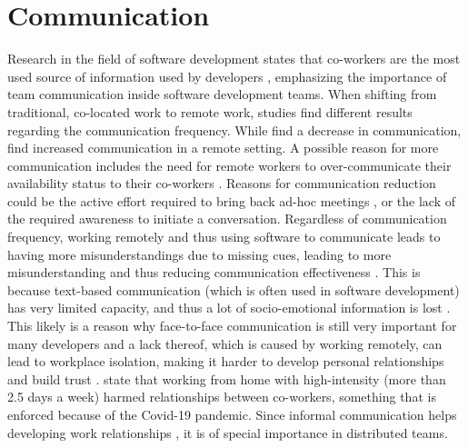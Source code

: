 \section{Communication}
Research in the field of software development states that co-workers are the most used source of information used by developers \autocite{ko2007information}, emphasizing the importance of team communication inside software development teams. When shifting from traditional, co-located work to remote work, studies find different results regarding the communication frequency. While \textcite{kraut1988patterns, allen1984managing} find a decrease in communication, \textcite{mulki2009set} find increased communication in a remote setting. A possible reason for more communication includes the need for remote workers to over-communicate their availability status to their co-workers \autocite{koehne2012remote}. Reasons for communication reduction could be the active effort required to bring back ad-hoc meetings \autocite{miller2021your}, or the lack of the required awareness to initiate a conversation. Regardless of communication frequency, working remotely and thus using software to communicate leads to having more misunderstandings due to missing cues, leading to more misunderstanding and thus reducing communication effectiveness \autocite{mulki2009set}. This is because text-based communication (which is often used in software development) has very limited capacity, and thus a lot of socio-emotional information is lost \autocite{hassib2017heartchat}. This likely is a reason why face-to-face communication is still very important for many developers \autocite{storey2016social} and a lack thereof, which is caused by working remotely, can lead to workplace isolation, making it harder to develop personal relationships and build trust \autocite{mulki2009set}. \textcite{gajendran2007good} state that working from home with high-intensity (more than 2.5 days a week) harmed relationships between co-workers, something that is enforced because of the Covid-19 pandemic. Since informal communication helps developing work relationships \autocite{comella2020revisiting, olson2006bridging}, it is of special importance in distributed teams.


